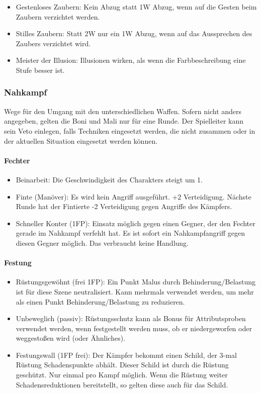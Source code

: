 \documentclass{article}
\begin{document}
\begin{itemize}
\item Gestenloses Zaubern: Kein Abzug statt 1W Abzug, wenn auf die Gesten beim Zaubern verzichtet werden.
\item Stilles Zaubern: Statt 2W nur ein 1W Abzug, wenn auf das Aussprechen des Zaubers verzichtet wird.
\item Meister der Illusion: Illusionen wirken, als wenn die Farbbeschreibung eine Stufe besser ist.
\end{itemize}

\subsubsection{Nahkampf}

Wege für den Umgang mit den unterschiedlichen Waffen. Sofern nicht anders angegeben, gelten die Boni und Mali nur für
eine Runde. Der Spielleiter kann sein Veto einlegen, falls Techniken eingesetzt werden, die nicht zusammen oder in
der aktuellen Situation eingesetzt werden können.

\paragraph{Fechter}

\begin{itemize}
\item Beinarbeit: Die Geschwindigkeit des Charakters steigt um 1.
\item Finte (Manöver): Es wird kein Angriff ausgeführt. +2 Verteidigung. Nächste Runde hat der Fintierte -2 Verteidigung gegen Angriffe des Kämpfers.
\item Schneller Konter (1FP): Einsatz möglich gegen einen Gegner, der den Fechter gerade im Nahkampf verfehlt hat. Es ist sofort ein Nahkampfangriff gegen diesen Gegner möglich. Das verbraucht keine Handlung.
\end{itemize}

\paragraph{Festung}

\begin{itemize}
\item Rüstungsgewöhnt (frei 1FP): Ein Punkt Malus durch Behinderung/Belastung ist für diese Szene neutralisiert. Kann mehrmals verwendet werden, um mehr als einen Punkt Behinderung/Belastung zu reduzieren.
\item Unbeweglich (passiv): Rüstungsschutz kann als Bonus für Attributsproben verwendet werden, wenn festgestellt werden muss, ob er niedergeworfen oder weggestoßen wird (oder Ähnliches).
\item Festungswall (1FP frei): Der Kämpfer bekommt einen Schild, der 3-mal Rüstung Schadenspunkte abhält. Dieser Schild ist durch die Rüstung geschützt. Nur einmal pro Kampf möglich. Wenn die Rüstung weiter Schadensreduktionen bereitstellt, so gelten diese auch für das Schild.
\end{itemize}
\end{document}
